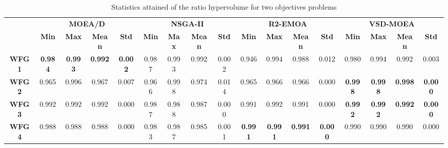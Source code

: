 \begin{table*}[t]
\caption{Statistics attained of the ratio hypervolume for two objectives problems}
\label{tab:StatisticsHV_2obj}
\centering
\begin{scriptsize}
\begin{tabular}{cc|c|c|c|c|c|c|c|c|c|c|c|c|c|c|c}
\cline{2-17}
\textbf{}                           & \multicolumn{4}{c|}{\textbf{MOEA/D}}                              & \multicolumn{4}{c|}{\textbf{NSGA-II}}                             & \multicolumn{4}{c|}{\textbf{R2-EMOA}}                             & \multicolumn{4}{c}{\textbf{VSD-MOEA}}                            \\ \cline{2-17} 
                                    & \textbf{Min}   & \textbf{Max}   & \textbf{Mean}  & \textbf{Std}   & \textbf{Min}   & \textbf{Max}   & \textbf{Mean}  & \textbf{Std}   & \textbf{Min}   & \textbf{Max}   & \textbf{Mean}  & \textbf{Std}   & \textbf{Min}   & \textbf{Max}   & \textbf{Mean}  & \textbf{Std}   \\ \hline
\multicolumn{1}{c|}{\textbf{WFG1}}  & \textbf{0.984} & \textbf{0.993} & \textbf{0.992} & \textbf{0.002} & 0.987          & 0.993          & 0.992          & 0.002          & 0.946          & 0.994          & 0.988          & 0.012          & 0.980          & 0.994          & 0.992          & 0.003          \\ \hline
\multicolumn{1}{c|}{\textbf{WFG2}}  & 0.965          & 0.996          & 0.967          & 0.007          & 0.966          & 0.998          & 0.974          & 0.014          & 0.965          & 0.966          & 0.966          & 0.000          & \textbf{0.998} & \textbf{0.998} & \textbf{0.998} & \textbf{0.000} \\ \hline
\multicolumn{1}{c|}{\textbf{WFG3}}  & 0.992          & 0.992          & 0.992          & 0.000          & 0.987          & 0.988          & 0.987          & 0.000          & 0.991          & 0.992          & 0.991          & 0.000          & \textbf{0.992} & \textbf{0.992} & \textbf{0.992} & \textbf{0.000} \\ \hline
\multicolumn{1}{c|}{\textbf{WFG4}}  & 0.988          & 0.988          & 0.988          & 0.000          & 0.983          & 0.987          & 0.985          & 0.001          & \textbf{0.991} & \textbf{0.991} & \textbf{0.991} & \textbf{0.000} & 0.990          & 0.990          & 0.990          & 0.000          \\ \hline

\end{tabular}
\end{scriptsize}
\end{table*}
